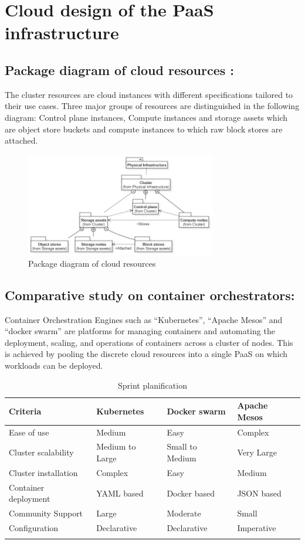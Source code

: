 \newpage

\section{Cloud design of the PaaS infrastructure}
\subsection{Package diagram of cloud resources :}

The cluster resources are cloud instances with different specifications tailored to their use cases. Three major groups of resources are distinguished in the following diagram: Control plane instances, Compute instances and storage assets which are object store buckets and compute instances to which raw block stores are attached.

\begin{figure}[H]\centering
\includegraphics[width=0.74\textwidth,angle=00]{assets/f11.jpg}
\caption{Package diagram of cloud resources }
\label{fig:Package diagram of cloud resources }
\end{figure}

\subsection{Comparative study on container orchestrators: }
Container Orchestration Engines such as “Kubernetes”, “Apache Mesos” and “docker swarm” are platforms for managing containers and automating the deployment, scaling, and operations of containers across a cluster of nodes. This is achieved by pooling the discrete cloud resources into a single PaaS on which workloads can be deployed. 

\begin{longtable}[H]{|m{3.5cm}|m{3.5cm}|m{3.5cm}|m{3.5cm}|}
\hline
Criteria & Kubernetes & Docker swarm & Apache Mesos  \\
\hline
Ease of use & Medium & Easy & Complex  \\
\hline
Cluster scalability & Medium to Large & Small to Medium & Very Large  \\
\hline
Cluster installation & Complex & Easy & Medium  \\
\hline
Container deployment & YAML based  & Docker based & JSON based \\
\hline
Community Support  & Large  & Moderate  & Small \\
\hline
Configuration & Declarative  & Declarative & Imperative \\
\hline
\caption{Sprint planification}
\end{longtable}

